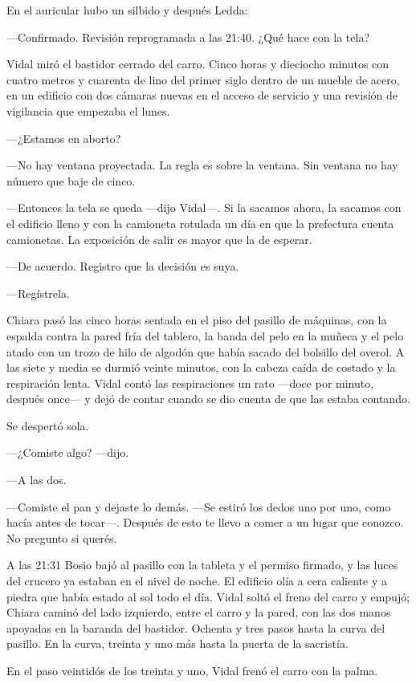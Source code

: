 En el auricular hubo un silbido y después Ledda:

---Confirmado. Revisión reprogramada a las 21:40. ¿Qué hace con la tela?

Vidal miró el bastidor cerrado del carro. Cinco horas y dieciocho minutos con cuatro metros y cuarenta de lino del primer siglo dentro de un mueble de acero, en un edificio con dos cámaras nuevas en el acceso de servicio y una revisión de vigilancia que empezaba el lunes.

---¿Estamos en aborto?

---No hay ventana proyectada. La regla es sobre la ventana. Sin ventana no hay número que baje de cinco.

---Entonces la tela se queda ---dijo Vidal---. Si la sacamos ahora, la sacamos con el edificio lleno y con la camioneta rotulada un día en que la prefectura cuenta camionetas. La exposición de salir es mayor que la de esperar.

---De acuerdo. Registro que la decisión es suya.

---Regístrela.

Chiara pasó las cinco horas sentada en el piso del pasillo de máquinas, con la espalda contra la pared fría del tablero, la banda del pelo en la muñeca y el pelo atado con un trozo de hilo de algodón que había sacado del bolsillo del overol. A las siete y media se durmió veinte minutos, con la cabeza caída de costado y la respiración lenta. Vidal contó las respiraciones un rato ---doce por minuto, después once--- y dejó de contar cuando se dio cuenta de que las estaba contando.

Se despertó sola.

---¿Comiste algo? ---dijo.

---A las dos.

---Comiste el pan y dejaste lo demás. ---Se estiró los dedos uno por uno, como hacía antes de tocar---. Después de esto te llevo a comer a un lugar que conozco. No pregunto si querés.

A las 21:31 Bosio bajó al pasillo con la tableta y el permiso firmado, y las luces del crucero ya estaban en el nivel de noche. El edificio olía a cera caliente y a piedra que había estado al sol todo el día. Vidal soltó el freno del carro y empujó; Chiara caminó del lado izquierdo, entre el carro y la pared, con las dos manos apoyadas en la baranda del bastidor. Ochenta y tres pasos hasta la curva del pasillo. En la curva, treinta y uno más hasta la puerta de la sacristía.

En el paso veintidós de los treinta y uno, Vidal frenó el carro con la palma.

